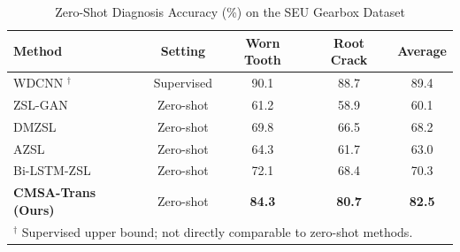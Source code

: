 \begin{table}[htbp]
\centering
\caption{Zero-Shot Diagnosis Accuracy (\%) on the SEU Gearbox Dataset}
\label{tab:seu_results}
\begin{tabular}{lcccc}
\toprule
\textbf{Method} & \textbf{Setting} & \textbf{Worn Tooth} & \textbf{Root Crack} & \textbf{Average} \\
\midrule
WDCNN \cite{zhang2017new}$^\dagger$ & Supervised & 90.1 & 88.7 & 89.4 \\
\midrule
ZSL-GAN \cite{xian2019fvaegan} & Zero-shot & 61.2 & 58.9 & 60.1 \\
DMZSL \cite{schonfeld2019generalized} & Zero-shot & 69.8 & 66.5 & 68.2 \\
AZSL \cite{lampert2014attribute} & Zero-shot & 64.3 & 61.7 & 63.0 \\
Bi-LSTM-ZSL \cite{chen2019bearing} & Zero-shot & 72.1 & 68.4 & 70.3 \\
\textbf{CMSA-Trans (Ours)} & Zero-shot & \textbf{84.3} & \textbf{80.7} & \textbf{82.5} \\
\bottomrule
\multicolumn{5}{l}{\footnotesize $^\dagger$ Supervised upper bound; not directly comparable to zero-shot methods.}
\end{tabular}
\end{table}
